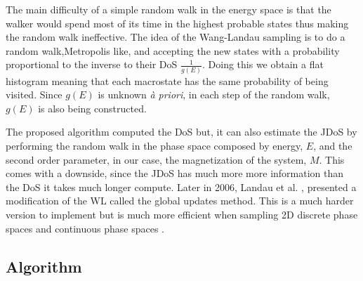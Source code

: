 The main difficulty of a simple random walk in the energy space is that the walker would spend most of its time in the highest probable states thus making the random walk ineffective. The idea of the Wang-Landau sampling is to do a random walk,Metropolis like, and accepting the new states with a probability proportional to the inverse to their DoS $\frac{1}{g(E)}$. Doing this we obtain a flat histogram meaning that each macrostate has the same probability of being visited.  
Since $g(E)$ is unknown \textit{à priori}, in each step of the random walk, $g(E)$ is also being constructed.

The proposed algorithm computed the DoS but, it can also estimate the JDoS by performing the random walk in the phase space composed by energy, $E$, and the second order parameter, in our case, the magnetization of the system, $M$. This comes with a downside, since the JDoS has much more more information than the DoS it takes much longer compute.
Later in 2006, Landau et al. \cite{WL_Cont}, presented a modification of the WL called the global updates method. This is a much harder version to implement but is much more efficient when sampling 2D discrete phase spaces and continuous phase spaces \cite{Poulain2006}.  

\subsection{Algorithm}

